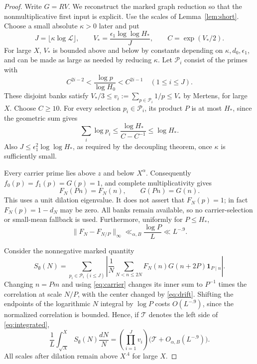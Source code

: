 \documentclass[11pt]{article}
\theoremstyle{remark}\newtheorem{remark}[theorem]{Remark}
\newcommand{\one}{\mathbf 1}
\newcommand{\calL}{\mathcal L}
\newcommand{\cP}{\mathcal P}
\begin{document}
\begin{proof}
Write $G=RV$. We reconstruct the marked graph reduction so that
the nonmultiplicative first input is explicit. Use the scales of
Lemma~\ref{lem:short}. Choose a small absolute $\kappa>0$ later and put
\[
 J=\lfloor\kappa\log\calL\rfloor,\qquad
 V_*=\frac{\epsilon_1\log\log H_*}{J},\qquad C=\exp(V_*/2).
\]
For large $X$, $V_*$ is bounded above and below by constants depending
on $\kappa,d_0,\epsilon_1$, and can be made as large as needed by
reducing $\kappa$. Let $\cP_i$ consist of the primes with
\[
 C^{2i-2}<\frac{\log p}{\log H_0}<C^{2i-1}\quad(1\le i\le J).
\]
These disjoint banks satisfy
$V_*/3\le v_i:=\sum_{p\in\cP_i}1/p\le V_*$ by Mertens, for large
$X$. Choose $C\ge10$. For every selection $p_i\in\cP_i$, its product
$P$ is at most $H_*$, since the geometric sum gives
\[
 \sum_i\log p_i\le
 \frac{\log H_*}{C-C^{-1}}\le\log H_*.
\]
Also $J\le\epsilon_1^2\log\log H_*$, as required by the decoupling
theorem, once $\kappa$ is sufficiently small.

Every carrier prime lies above $z$ and below $X^\alpha$.
Consequently $f_0(p)=f_1(p)=G(p)=1$, and complete multiplicativity gives
\begin{equation}\label{eq:carrier}
           F_N(Pn)=F_N(n),\qquad G(Pn)=G(n).
\end{equation}
This uses a unit dilation eigenvalue. It does not assert that
$F_N(p)=1$; in fact $F_N(p)=1-d_N$ may be zero. All banks remain
available, so no carrier-selection or small-mean fallback is used.
Furthermore, uniformly for $P\le H_*$,
\begin{equation}\label{eq:drift}
          \|F_N-F_{N/P}\|_\infty
                \ll_{\alpha,B}\frac{\log P}{L}\ll L^{-.9}.
\end{equation}

Consider the nonnegative marked quantity
\[
 S_{\emptyset}(N)=\sum_{p_i\in\cP_i\ (i\le J)}
 \left|\frac1N\sum_{N<n\le2N}
                   F_N(n)G(n+2P)\one_{P\mid n}\right|.
\]
Changing $n=Pm$ and using \eqref{eq:carrier} changes its inner sum
to $P^{-1}$ times the correlation at scale $N/P$, with the center
changed by \eqref{eq:drift}. Shifting the endpoints of the logarithmic
$N$ integral by $\log P$ costs $O(L^{-.9})$, since the normalized
correlation is bounded. Hence, if $\mathcal T$ denotes the left side
of \eqref{eq:integrated},
\begin{equation}\label{eq:marked-integral}
 \frac1L\int_{\sqrt X}^X S_{\emptyset}(N)\frac{dN}{N}
       =\left(\prod_{i=1}^Jv_i\right)
                       \bigl(\mathcal T+O_{\alpha,B}(L^{-.9})\bigr).
\end{equation}
All scales after dilation remain above $X^{.4}$ for large $X$.


\end{proof}
\end{document}
